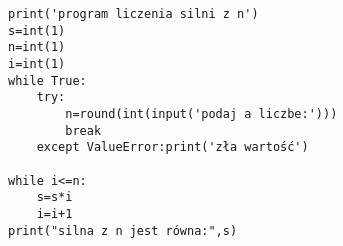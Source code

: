 \begin{verbatim}
print('program liczenia silni z n')
s=int(1)
n=int(1)
i=int(1)
while True:
    try:
        n=round(int(input('podaj a liczbe:')))
        break   
    except ValueError:print('zła wartość')

while i<=n:
    s=s*i
    i=i+1
print("silna z n jest równa:",s)
\end{verbatim}